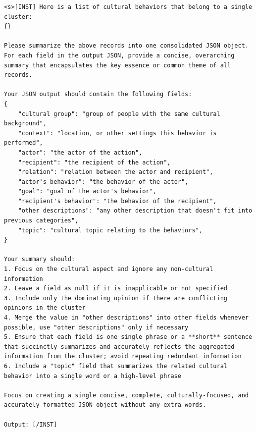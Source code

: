 \documentclass{article} %
\begin{document}
\begin{lstlisting}[language={}, caption=Prompt for Mixtral-8X7B on cluster summarizer, label=lst:summarization_prompt]
<s>[INST] Here is a list of cultural behaviors that belong to a single cluster:
{}

Please summarize the above records into one consolidated JSON object. For each field in the output JSON, provide a concise, overarching summary that encapsulates the key essence or common theme of all records.

Your JSON output should contain the following fields:
{
    "cultural group": "group of people with the same cultural background",
    "context": "location, or other settings this behavior is performed",
    "actor": "the actor of the action",
    "recipient": "the recipient of the action",
    "relation": "relation between the actor and recipient",
    "actor's behavior": "the behavior of the actor",
    "goal": "goal of the actor's behavior",
    "recipient's behavior": "the behavior of the recipient",
    "other descriptions": "any other description that doesn't fit into previous categories",
    "topic": "cultural topic relating to the behaviors",
}

Your summary should:
1. Focus on the cultural aspect and ignore any non-cultural information
2. Leave a field as null if it is inapplicable or not specified
3. Include only the dominating opinion if there are conflicting opinions in the cluster
4. Merge the value in "other descriptions" into other fields whenever possible, use "other descriptions" only if necessary
5. Ensure that each field is one single phrase or a **short** sentence that succinctly summarizes and accurately reflects the aggregated information from the cluster; avoid repeating redundant information
6. Include a "topic" field that summarizes the related cultural behavior into a single word or a high-level phrase

Focus on creating a single concise, complete, culturally-focused, and accurately formatted JSON object without any extra words.

Output: [/INST]
\end{lstlisting}
\end{document}
